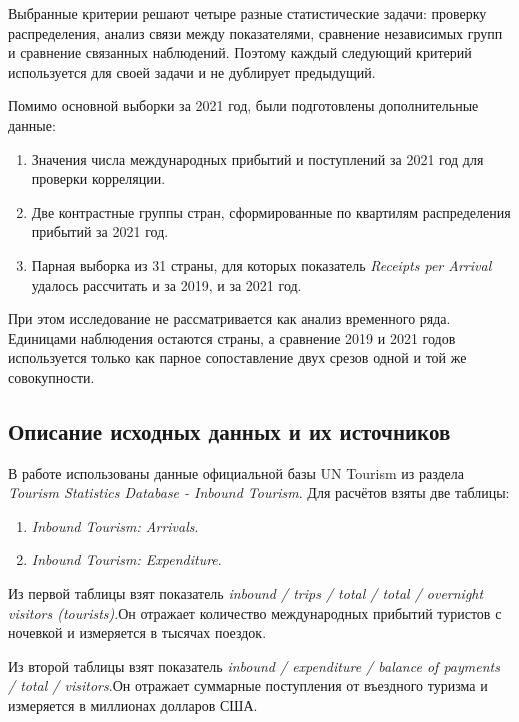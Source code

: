 \documentclass[14pt,a4paper]{extarticle}
\begin{document}
Выбранные критерии решают четыре разные статистические задачи: проверку распределения, анализ связи между показателями, сравнение независимых групп и сравнение связанных наблюдений. Поэтому каждый следующий критерий используется для своей задачи и не дублирует предыдущий.

Помимо основной выборки за 2021 год, были подготовлены дополнительные данные:
\begin{enumerate}[leftmargin=1.25cm]
    \item Значения числа международных прибытий и поступлений за 2021 год для проверки корреляции.
    \item Две контрастные группы стран, сформированные по квартилям распределения прибытий за 2021 год.
    \item Парная выборка из 31 страны, для которых показатель \textit{Receipts per Arrival} удалось рассчитать и за 2019, и за 2021 год.
\end{enumerate}

При этом исследование не рассматривается как анализ временного ряда. Единицами наблюдения остаются страны, а сравнение 2019 и 2021 годов используется только как парное сопоставление двух срезов одной и той же совокупности.

\subsection{Описание исходных данных и их источников}

В работе использованы данные официальной базы UN Tourism из раздела \textit{Tourism Statistics Database - Inbound Tourism}. Для расчётов взяты две таблицы:
\begin{enumerate}[leftmargin=1.25cm]
    \item \textit{Inbound Tourism: Arrivals}.
    \item \textit{Inbound Tourism: Expenditure}.
\end{enumerate}

Из первой таблицы взят показатель \textit{inbound / trips / total / total / overnight visitors (tourists)}.\linebreak Он отражает количество международных прибытий туристов с ночевкой и измеряется в тысячах поездок.

Из второй таблицы взят показатель \textit{inbound / expenditure / balance of payments / total / visitors}.\linebreak Он отражает суммарные поступления от въездного туризма и измеряется в миллионах долларов США.
\end{document}

